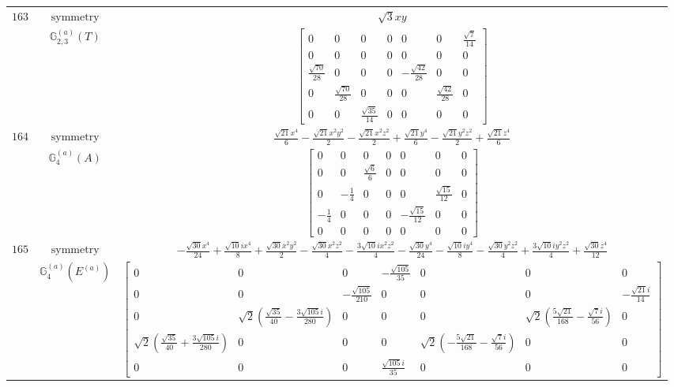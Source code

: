 \documentclass[fleqn,8pt,landscape]{jsarticle}
\begin{document}
\begin{longtable}{ccc}
$ 163 $ & $ \text{symmetry} $ & $ \sqrt{3} x y $ \\
$  $ & $ \mathbb{G}_{2,3}^{(a)}(T) $ & $ \begin{bmatrix} 0 & 0 & 0 & 0 & 0 & 0 & \frac{\sqrt{7}}{14} \\ 0 & 0 & 0 & 0 & 0 & 0 & 0 \\ \frac{\sqrt{70}}{28} & 0 & 0 & 0 & - \frac{\sqrt{42}}{28} & 0 & 0 \\ 0 & \frac{\sqrt{70}}{28} & 0 & 0 & 0 & \frac{\sqrt{42}}{28} & 0 \\ 0 & 0 & \frac{\sqrt{35}}{14} & 0 & 0 & 0 & 0 \end{bmatrix} $ \\ \hline
$ 164 $ & $ \text{symmetry} $ & $ \frac{\sqrt{21} x^{4}}{6} - \frac{\sqrt{21} x^{2} y^{2}}{2} - \frac{\sqrt{21} x^{2} z^{2}}{2} + \frac{\sqrt{21} y^{4}}{6} - \frac{\sqrt{21} y^{2} z^{2}}{2} + \frac{\sqrt{21} z^{4}}{6} $ \\
$  $ & $ \mathbb{G}_{4}^{(a)}(A) $ & $ \begin{bmatrix} 0 & 0 & 0 & 0 & 0 & 0 & 0 \\ 0 & 0 & \frac{\sqrt{6}}{6} & 0 & 0 & 0 & 0 \\ 0 & - \frac{1}{4} & 0 & 0 & 0 & \frac{\sqrt{15}}{12} & 0 \\ - \frac{1}{4} & 0 & 0 & 0 & - \frac{\sqrt{15}}{12} & 0 & 0 \\ 0 & 0 & 0 & 0 & 0 & 0 & 0 \end{bmatrix} $ \\ \hline
$ 165 $ & $ \text{symmetry} $ & $ - \frac{\sqrt{30} x^{4}}{24} + \frac{\sqrt{10} i x^{4}}{8} + \frac{\sqrt{30} x^{2} y^{2}}{2} - \frac{\sqrt{30} x^{2} z^{2}}{4} - \frac{3 \sqrt{10} i x^{2} z^{2}}{4} - \frac{\sqrt{30} y^{4}}{24} - \frac{\sqrt{10} i y^{4}}{8} - \frac{\sqrt{30} y^{2} z^{2}}{4} + \frac{3 \sqrt{10} i y^{2} z^{2}}{4} + \frac{\sqrt{30} z^{4}}{12} $ \\
$  $ & $ \mathbb{G}_{4}^{(a)}(E^{(a)}) $ & $ \begin{bmatrix} 0 & 0 & 0 & - \frac{\sqrt{105}}{35} & 0 & 0 & 0 \\ 0 & 0 & - \frac{\sqrt{105}}{210} & 0 & 0 & 0 & - \frac{\sqrt{21} i}{14} \\ 0 & \sqrt{2} \left(\frac{\sqrt{35}}{40} - \frac{3 \sqrt{105} i}{280}\right) & 0 & 0 & 0 & \sqrt{2} \left(\frac{5 \sqrt{21}}{168} - \frac{\sqrt{7} i}{56}\right) & 0 \\ \sqrt{2} \left(\frac{\sqrt{35}}{40} + \frac{3 \sqrt{105} i}{280}\right) & 0 & 0 & 0 & \sqrt{2} \left(- \frac{5 \sqrt{21}}{168} - \frac{\sqrt{7} i}{56}\right) & 0 & 0 \\ 0 & 0 & 0 & \frac{\sqrt{105} i}{35} & 0 & 0 & 0 \end{bmatrix} $ \\ \hline

\end{longtable}
\end{document}
